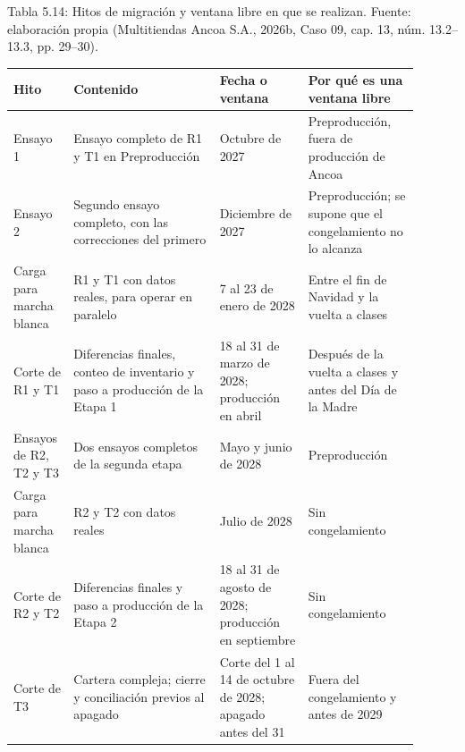 \documentclass[11pt]{article}
\begin{document}
\par\vspace{0.6\baselineskip}\noindent\begin{minipage}{\linewidth}
Tabla 5.14: Hitos de migración y ventana libre en que se realizan. Fuente: elaboración propia (Multitiendas Ancoa S.A., 2026b, Caso 09, cap. 13, núm. 13.2–13.3, pp. 29–30).\label{tab:t19}\par\vspace{0.3\baselineskip}
\begin{tabular}{@{}p{0.108\linewidth}p{0.332\linewidth}p{0.209\linewidth}p{0.253\linewidth}@{}}
\toprule Hito & Contenido & Fecha o ventana & Por qué es una ventana libre \\
\midrule
Ensayo 1 & Ensayo completo de R1 y T1 en Preproducción & Octubre de 2027 & Preproducción, fuera de producción de Ancoa \\
Ensayo 2 & Segundo ensayo completo, con las correcciones del primero & Diciembre de 2027 & Preproducción; se supone que el congelamiento no lo alcanza \\
Carga para marcha blanca & R1 y T1 con datos reales, para operar en paralelo & 7 al 23 de enero de 2028 & Entre el fin de Navidad y la vuelta a clases \\
Corte de R1 y T1 & Diferencias finales, conteo de inventario y paso a producción de la Etapa 1 & 18 al 31 de marzo de 2028; producción en abril & Después de la vuelta a clases y antes del Día de la Madre \\
Ensayos de R2, T2 y T3 & Dos ensayos completos de la segunda etapa & Mayo y junio de 2028 & Preproducción \\
Carga para marcha blanca & R2 y T2 con datos reales & Julio de 2028 & Sin congelamiento \\
Corte de R2 y T2 & Diferencias finales y paso a producción de la Etapa 2 & 18 al 31 de agosto de 2028; producción en septiembre & Sin congelamiento \\
Corte de T3 & Cartera compleja; cierre y conciliación previos al apagado & Corte del 1 al 14 de octubre de 2028; apagado antes del 31 & Fuera del congelamiento y antes de 2029 \\
\bottomrule
\end{tabular}
\end{minipage}
\par
\end{document}
